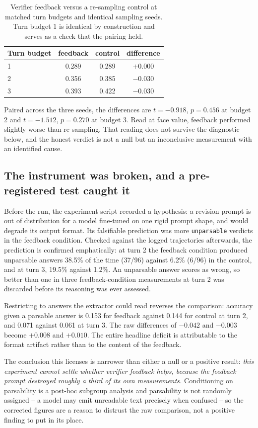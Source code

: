 \documentclass[11pt]{article}
\begin{document}
\begin{table}[h]
\centering
\begin{tabular}{lccc}
\toprule
Turn budget & feedback & control & difference \\
\midrule
1 & 0.289 & 0.289 & $+0.000$ \\
2 & 0.356 & 0.385 & $-0.030$ \\
3 & 0.393 & 0.422 & $-0.030$ \\
\bottomrule
\end{tabular}
\caption{Verifier feedback versus a re-sampling control at matched turn budgets and identical sampling seeds. Turn budget 1 is identical by construction and serves as a check that the pairing held.}
\end{table}

Paired across the three seeds, the differences are $t=-0.918$, $p=0.456$ at
budget 2 and $t=-1.512$, $p=0.270$ at budget 3. Read at face value, feedback
performed slightly worse than re-sampling. That reading does not survive the
diagnostic below, and the honest verdict is not a null but an inconclusive
measurement with an identified cause.

\subsection{The instrument was broken, and a pre-registered test caught it}
Before the run, the experiment script recorded a hypothesis: a revision
prompt is out of distribution for a model fine-tuned on one rigid prompt
shape, and would degrade its output format. Its falsifiable prediction was
more \texttt{unparsable} verdicts in the feedback condition. Checked against
the logged trajectories afterwards, the prediction is confirmed
emphatically: at turn 2 the feedback condition produced unparsable answers
38.5\% of the time (37/96) against 6.2\% (6/96) in the control, and at turn
3, 19.5\% against 1.2\%. An unparsable answer scores as wrong, so better
than one in three feedback-condition measurements at turn 2 was discarded
before its reasoning was ever assessed.

Restricting to answers the extractor could read reverses the comparison:
accuracy given a parsable answer is 0.153 for feedback against 0.144 for
control at turn 2, and 0.071 against 0.061 at turn 3. The raw differences of
$-0.042$ and $-0.003$ become $+0.008$ and $+0.010$. The entire headline
deficit is attributable to the format artifact rather than to the content of
the feedback.

The conclusion this licenses is narrower than either a null or a positive
result: \emph{this experiment cannot settle whether verifier feedback helps,
because the feedback prompt destroyed roughly a third of its own
measurements.} Conditioning on parsability is a post-hoc subgroup analysis
and parsability is not randomly assigned -- a model may emit unreadable text
precisely when confused -- so the corrected figures are a reason to
distrust the raw comparison, not a positive finding to put in its place.
\end{document}
